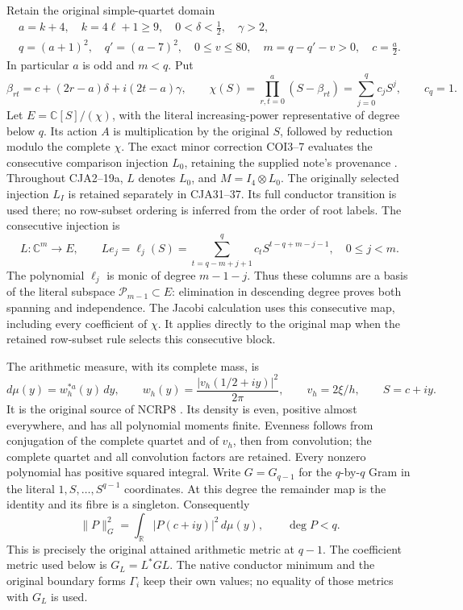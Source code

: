 Retain the original simple-quartet domain
\[
\begin{gathered}
 a=k+4,\quad k=4\ell+1\geq9,\quad
 0<\delta<\tfrac12,\quad \gamma>2,\\
 q=(a+1)^2,\quad q'=(a-7)^2,\quad
 0\leq v\leq80,\quad m=q-q'-v>0,\quad c=\tfrac a2.
\end{gathered}
\]
In particular \(a\) is odd and \(m<q\).
Put
\begin{equation}
 \beta_{rt}=c+(2r-a)\delta+i(2t-a)\gamma,\qquad
 \chi(S)=\prod_{r,t=0}^{a}(S-\beta_{rt})
        =\sum_{j=0}^q c_jS^j,\qquad c_q=1 .
 \tag{CJA1}
\end{equation}
Let \(E=\mathbb C[S]/(\chi)\), with the literal increasing-power
representative of degree below \(q\).  Its action \(A\) is multiplication
by the original \(S\), followed by reduction modulo the complete \(\chi\).
The exact minor correction COI3--7 evaluates the consecutive
comparison injection \(L_0\), retaining the supplied note's provenance
\cite{a03cm:program:arrival03-01}.
Throughout CJA2--19a, \(L\) denotes \(L_0\), and
\(M=I_4\otimes L_0\).  The originally selected injection \(L_I\)
is retained separately in CJA31--37.
Its full conductor transition is used there; no row-subset ordering
is inferred from the order of root labels.
The consecutive injection is
\begin{equation}
 L:\mathbb C^m\longrightarrow E,\qquad
 Le_j=\ell_j(S)=
 \sum_{t=q-m+j+1}^{q}c_tS^{t-q+m-j-1},\quad 0\leq j<m .
 \tag{CJA2}
\end{equation}
The polynomial \(\ell_j\) is monic of degree \(m-1-j\).
Thus these columns are a basis of the literal subspace
\(\mathcal P_{m-1}\subset E\): elimination in descending degree proves
both spanning and independence.  The Jacobi calculation uses this
consecutive map, including every coefficient of \(\chi\).
It applies directly to the original map when the retained row-subset
rule selects this consecutive block.

The arithmetic measure, with its complete mass, is
\begin{equation}
 d\mu(y)=w_h^{*a}(y)\,dy,\qquad
 w_h(y)=\frac{|v_h(1/2+iy)|^2}{2\pi},\qquad
 v_h=2\xi/h,\qquad S=c+iy .
 \tag{CJA3}
\end{equation}
It is the original source of NCRP8 \cite{a03cm:prog:NCRP}.
Its density is even, positive almost everywhere, and has all polynomial
moments finite.  Evenness follows from conjugation of the complete
quartet and of \(v_h\), then from convolution; the complete quartet and
all convolution factors are retained.
Every nonzero polynomial has positive squared integral.
Write \(G=G_{q-1}\) for the \(q\)-by-\(q\) Gram in the literal
\(1,S,\ldots,S^{q-1}\) coordinates.
At this degree the remainder map is the identity and its fibre is a
singleton.  Consequently
\begin{equation}
 \|P\|_G^2=\int_{\mathbb R}|P(c+iy)|^2\,d\mu(y),
 \qquad \deg P<q.
 \tag{CJA4}
\end{equation}
This is precisely the original attained arithmetic metric at \(q-1\).
The coefficient metric used below is \(G_L=L^*GL\).
The native conductor minimum and the original boundary forms
\(\Gamma_i\) keep their own values; no equality of those metrics with
\(G_L\) is used.

